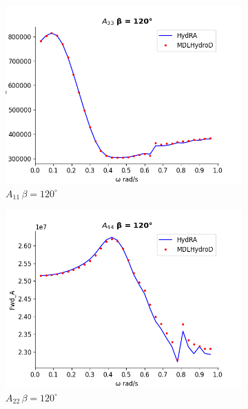 \begin{figure}[H]
    \vspace{5pt}%
    \begin{subfigure}[b]{0.49\textwidth}
        \includegraphics[width=\textwidth]{plots/kvlcc/added_mass/a33.png}
        \caption{$A_{11}\, \beta = 120^{\circ}$}
    \end{subfigure}
    \begin{subfigure}[b]{0.49\textwidth}
        \includegraphics[width=\textwidth]{plots/kvlcc/added_mass/a44.png}
        \caption{$A_{22} \, \beta = 120^{\circ}$}
    \end{subfigure}
    \vspace{5pt}%
    \begin{subfigure}[b]{0.49\textwidth}

\end{subfigure}
\end{figure}
